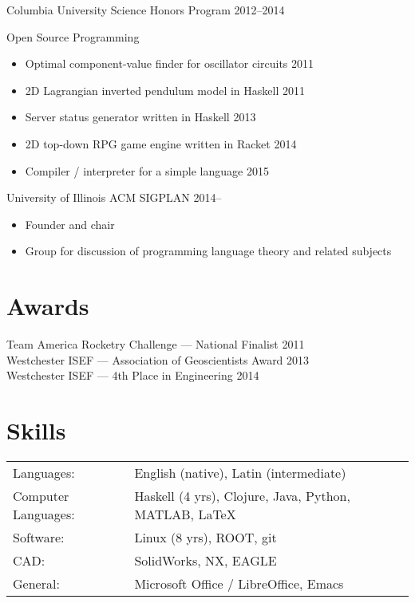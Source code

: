 \documentclass[margin]{res}
\begin{document}
\begin{resume}
Columbia University Science Honors Program \hfill 2012--2014

Open Source Programming
  \begin{itemize} \itemsep -2pt
    \item Optimal component-value finder for oscillator circuits \hfill 2011
    \item 2D Lagrangian inverted pendulum model in Haskell \hfill 2011
    \item Server status generator written in Haskell \hfill 2013
    \item 2D top-down RPG game engine written in Racket \hfill 2014
    \item Compiler / interpreter for a simple language \hfill 2015
  \end{itemize}

University of Illinois ACM SIGPLAN \hfill 2014--
  \begin{itemize} \itemsep -2pt
    \item Founder and chair
    \item Group for discussion of programming language theory and related subjects
  \end{itemize}
            
\section{Awards} 
Team America Rocketry Challenge --- National Finalist \hfill 2011 \\
Westchester ISEF --- Association of Geoscientists Award \hfill 2013 \\
Westchester ISEF --- 4th Place in Engineering \hfill 2014 \\

\section{Skills}
  \begin{tabular}{l p{4in}} \\
    Languages: & English (native), Latin (intermediate) \\
    Computer Languages: & Haskell (4 yrs), Clojure, Java, Python, MATLAB, \LaTeX \\
    Software: & Linux (8 yrs), ROOT, git \\
    CAD: & SolidWorks, NX, EAGLE \\
    General: & Microsoft Office / LibreOffice, Emacs
  \end{tabular}


\end{resume}
\end{document}
